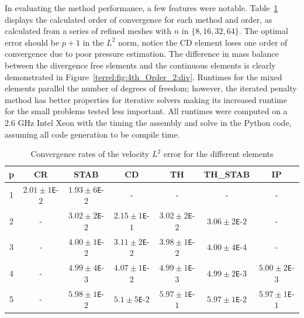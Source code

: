 In evaluating the method performance, a few features were
notable. Table~\ref{terrel:tab:vel_error} displays the calculated order of
convergence for each method and order, as calculated from a series of refined
meshes with $n$ in $\{8, 16, 32, 64\}$.  The optimal error should be $p + 1$
in the $L^2$ norm, notice the CD element loses one order of convergence due to
poor pressure estimation.  The difference in mass balance between the divergence free
elements and the continuous elements is clearly demonstrated in
Figure~\ref{terrel:fig:4th_Order_2:div}.  Runtimes for the mixed elements
parallel the number of degrees of freedom; however, the iterated penalty method
has better properties for iterative solvers making its increased runtime for
the small problems tested less important.  All runtimes were computed on a 2.6
GHz Intel Xeon with the timing the assembly and solve in the Python code,
assuming all code generation to be compile time.

\renewcommand\arraystretch{1.5}%
\begin{table}
  \centering
  \caption{Convergence rates of the velocity $L^2$ error for the different
    elements}
  \label{terrel:tab:vel_error}
  \small
  \begin{tabular}{|c|cccccc|}
    \hline
    p  & CR &  STAB &  CD  &TH & TH\_STAB &  IP \\
\hline
   1 & $2.01\pm1${\tt E}-$2$ & $1.93\pm6${\tt E}-$2$ & - & - & -  & -\\
   2 & -                 & $3.02\pm2${\tt E}-$2$ & $2.15\pm1${\tt E}-$1$ & $3.02\pm2${\tt E}-$2$ & $3.06\pm2${\tt E}-$2$ & -  \\
   3 & -                 & $4.00\pm1${\tt E}-$2$ & $3.11\pm2${\tt E}-$2$ & $3.98\pm1${\tt E}-$2$ & $4.00\pm4${\tt E}-$4$ & -  \\
   4 & -                 & $4.99\pm4${\tt E}-$3$ & $4.07\pm1${\tt E}-$2$ & $4.99\pm1${\tt E}-$3$ & $4.99\pm2${\tt E}-$3$ & $5.00\pm2${\tt E}-$3$\\
   5 & -                 & $5.98\pm1${\tt E}-$2$ & $5.1\pm5${\tt E}-$2$ & $5.97\pm1${\tt E}-$1$ & $5.97\pm1${\tt E}-$2$ & $5.97\pm1${\tt E}-$1$\\
    \hline
   \end{tabular}
\end{table}
\renewcommand\arraystretch{1}%



